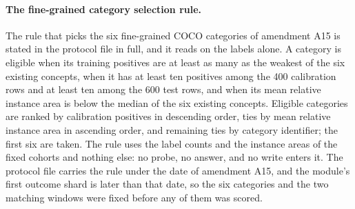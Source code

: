 \documentclass{article}
\begin{document}
\paragraph{The fine-grained category selection rule.} The rule that picks the six fine-grained COCO categories of amendment A15 is stated in the protocol file in full, and it reads on the labels alone. A category is eligible when its training positives are at least as many as the weakest of the six existing concepts, when it has at least ten positives among the 400 calibration rows and at least ten among the 600 test rows, and when its mean relative instance area is below the median of the six existing concepts. Eligible categories are ranked by calibration positives in descending order, ties by mean relative instance area in ascending order, and remaining ties by category identifier; the first six are taken. The rule uses the label counts and the instance areas of the fixed cohorts and nothing else: no probe, no answer, and no write enters it. The protocol file carries the rule under the date of amendment A15, and the module's first outcome shard is later than that date, so the six categories and the two matching windows were fixed before any of them was scored.
\end{document}

